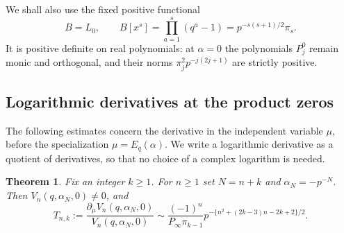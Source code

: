 \documentclass[11pt]{article}
\numberwithin{equation}{section}
\newtheorem{theorem}{Theorem}[section]
\theoremstyle{definition}
\theoremstyle{remark}
\begin{document}
We shall also use the fixed positive functional
\begin{equation}\label{mx:B-functional}
 B=L_0,\qquad
 B[x^s]=\prod_{a=1}^{s}(q^a-1)
       =p^{-s(s+1)/2}\pi_s.
\end{equation}
It is positive definite on real polynomials: at $\alpha=0$ the
polynomials $P_j^0$ remain monic and orthogonal, and their norms
$\pi_j^2p^{-j(2j+1)}$ are strictly positive.

\subsection{Logarithmic derivatives at the product zeros}

The following estimates concern the derivative in the independent
variable $\mu$, before the specialization $\mu=E_q(\alpha)$.
We write a logarithmic derivative as a quotient of derivatives, so
that no choice of a complex logarithm is needed.

\begin{theorem}\label{mx:log-derivative}
Fix an integer $k\ge1$.  For $n\ge1$ set $N=n+k$ and
$\alpha_N=-p^{-N}$.  Then $V_n(q,\alpha_N,0)\ne0$, and
\begin{equation}\label{mx:log-derivative-asymptotic}
 T_{n,k}:=
 \frac{\partial_\mu V_n(q,\alpha_N,0)}{V_n(q,\alpha_N,0)}
 \sim
 \frac{(-1)^n}{P_\infty\pi_{k-1}}
 p^{-\{n^2+(2k-3)n-2k+2\}/2}.
\end{equation}
\end{theorem}
\end{document}
